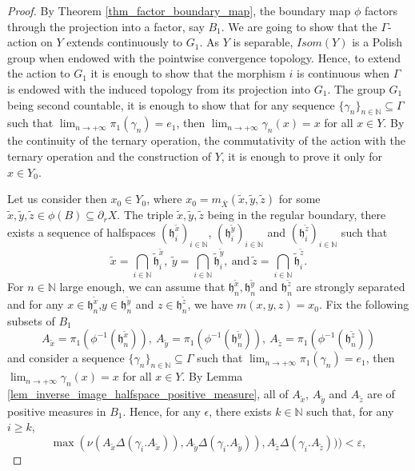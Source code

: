 \documentclass{amsart}
\numberwithin{equation}{section}
\newcommand{\hh}{\mathfrak{h}}    %
\newcommand{\NN}{\mathbb{N}}      %
\theoremstyle{definition}
\def\bar{\overline}
\begin{document}
    \begin{proof}
        By Theorem \ref{thm_factor_boundary_map}, the boundary map $\phi$ factors through the projection into a factor, say $B_1$. We are going to show that the $\Gamma$-action on $Y$ extends continuously to $G_1$. As $Y$ is separable, $Isom(Y)$ is a Polish group when endowed with the pointwise convergence topology. Hence, to extend the action to $G_1$ it is enough to show that the morphism $i$ is continuous when $\Gamma$ is endowed with the induced topology from its projection into $G_1$. The group $G_1$ being second countable, it is enough to show that for any sequence $\{\gamma_n\}_{n\in\NN}\subseteq \Gamma$ such that $\lim_{n \to +\infty} \pi_1(\gamma_n)=e_1$, then $\lim_{n \to +\infty} \gamma_n(x)=x$ for all $x\in Y$. By the continuity of the ternary operation, the commutativity of the action with the ternary operation and the construction of $Y$, it is enough to prove it only for $x\in Y_0$. \par 
        Let us consider then $x_0\in Y_0$, where $x_0=m_{\bar X}(\tilde{x},\tilde{y},\tilde{z})$ for some $\tilde{x},\tilde{y},\tilde{z}\in\phi(B)\subseteq \partial_r X$. The triple $\tilde{x},\tilde{y},\tilde{z}$ being in the regular boundary, there exists a sequence of halfspaces $(\hh_i^{\tilde{x}})_{i\in\NN}$, $(\hh_i^{\tilde{y}})_{i\in\NN}$ and $(\hh_i^{\tilde{z}})_{i\in\NN}$ such that 
        \[
        \tilde{x}=\bigcap_{i\in\NN}\tilde{\hh}_i^{\tilde{x}}, \ \tilde{y}=\bigcap_{i\in\NN}\tilde{\hh}_i^{\tilde{y}},\ \text{and}\ \tilde{z}=\bigcap_{i\in\NN}\tilde{\hh}_i^{\tilde{z}}.
        \]
        For $n\in \NN$ large enough, we can assume that $\hh_n^{\tilde{x}},\hh_n^{\tilde{y}}$ and $\hh_n^{\tilde{z}}$ are strongly separated and for any $x\in\hh_n^{\tilde{x}}$,$y\in\hh_n^{\tilde{y}}$ and $z\in\hh_n^{\tilde{z}}$, we have $m(x,y,z)=x_0$. Fix the following subsets of $B_1$ 
        \[
        A_{\tilde{x}}=\pi_1(\phi^{-1}(\hh_n^{\tilde{x}})),\ A_{\tilde{y}}=\pi_1(\phi^{-1}(\hh_n^{\tilde{y}})),\ A_{\tilde{z}}=\pi_1(\phi^{-1}(\hh_n^{\tilde{z}}))
        \]
        and consider a sequence $\{\gamma_n\}_{n\in\NN}\subseteq \Gamma$ such that $\lim_{n \to +\infty} \pi_1(\gamma_n)=e_1$, then $\lim_{n \to +\infty} \gamma_n(x)=x$ for all $x\in Y$. By Lemma \ref{lem_inverse_image_halfspace_positive_measure}, all of $A_{\tilde{x}}$, $A_{\tilde{y}}$ and $A_{\tilde{z}}$ are of positive measures in $B_1$. Hence, for any $\epsilon$, there exists $k\in \NN$ such that, for any $i \geq k$,
        \[
       \max ( \nu(A_{\tilde{x}}\Delta(\gamma_i.A_{\tilde{x}})),A_{\tilde{y}}\Delta(\gamma_i.A_{\tilde{y}})),A_{\tilde{z}}\Delta(\gamma_i.A_{\tilde{z}})))<\varepsilon,
\]
\end{proof}
\end{document}
